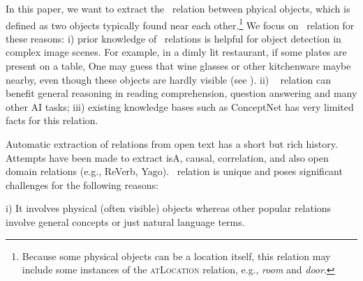 In this paper, we want to extract the \lnear\ relation between
phyical objects, which is defined as two objects typically found near each
other.\footnote{Because some physical objects can be a location itself, this
relation may include some instances of the \textsc{atLocation} relation,
e.g., {\em room} and {\em door}.}
We focus on \lnear\ relation for these reasons: 
i) prior knowledge of \lnear\ relations is helpful for object detection in complex image 
scenes. 
For example, in a dimly lit restaurant, if some plates are present on a table,
One may guess that wine glasses or other kitchenware maybe nearby, 
even though these objects are hardly visible (see ). 
ii) \lnear~ relation can benefit general reasoning in reading comprehension,
question answering and many other AI tasks;
iii) existing knowledge bases such as ConceptNet has very limited facts for
this relation.

%
%
%
%

Automatic extraction of relations from open text has a short but rich history. 
Attempts have been made to extract isA, causal, correlation, and 
also open domain relations (e.g., ReVerb, Yago).
\lnear~relation is unique and poses significant challenges
for the following reasons:

i) It involves physical (often visible) objects whereas other 
popular relations involve general concepts or just natural language terms. 

